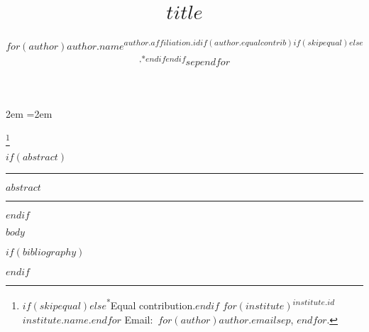 \documentclass[letterpaper,twocolumn,10pt]{article}
\title{%
  \begin{minipage}{\textwidth}%
    \begin{flushleft}%
      {\normalfont\sffamily\bfseries\Huge $title$}%
    \end{flushleft}%
  \end{minipage}%
}
\author{%
  \begin{minipage}{\textwidth}%
    \begin{flushleft}%
      {%
        \normalfont\sffamily\Large%
        $for(author)$$author.name$\textsuperscript{$author.affiliation.id$$if(author.equalcontrib)$$if(skipequal)$$else$,*$endif$$endif$}$sep$\quad $endfor$%
      }%
    \end{flushleft}%
  \end{minipage}%
}
\date{}
\newcommand\blfootnote[1]{%
  \begingroup
  \renewcommand\thefootnote{}\footnote{\raggedright \hspace{-20pt} #1}%
  \addtocounter{footnote}{-1}%
  \endgroup
}
\begin{document}
\maketitle
\fussy
{}
\emergencystretch 2em
\thispagestyle{fancy}
\parindent=2em
\setnowidow[2]

\blfootnote{%
  {%
    \normalfont\sffamily\scriptsize\raggedright
    $if(skipequal)$$else$\textsuperscript{*}Equal contribution.$endif$%
    $for(institute)$\mbox{\textsuperscript{$institute.id$}$institute.name$.}\enspace$endfor$%
    Email:~$for(author)$\mbox{\texttt{$author.email$}}$sep$, $endfor$.%
  }%
}

$if(abstract)$
\hrule height 1pt
\vspace{0.5em}

{\parindent=0pt \normalfont\sffamily\small $abstract$}

\vspace{0.5em}
\hrule height 1pt
$endif$

$body$

$if(bibliography)$
\footnotesize


$endif$
\end{document}
